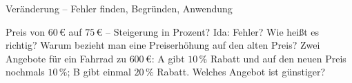 \begin{aufgabe}{Veränderung – Fehler finden, Begründen, Anwendung}
\begin{teile}
\teil Preis von $60\,€$ auf $75\,€$ – Steigerung in Prozent? Ida:  Fehler? Wie heißt es richtig?
\teil Warum bezieht man eine Preiserhöhung auf den alten Preis?
\teil Zwei Angebote für ein Fahrrad zu $600\,€$: A gibt $10\,\%$ Rabatt und auf den neuen Preis nochmals $10\,\%$; B gibt einmal $20\,\%$ Rabatt. Welches Angebot ist günstiger?
\end{teile}
\end{aufgabe}

